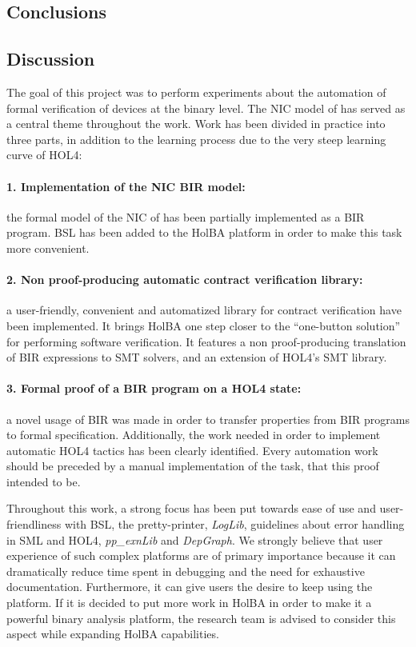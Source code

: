 \documentclass[10pt,a4paper]{article}
\begin{document}
\begin{multicols}{2}
\section{Conclusions}

\subsection{Discussion}

The goal of this project was to perform experiments about the automation of formal verification of devices at the binary level. The NIC model of \cite{haglund_formal_2016} has served as a central theme throughout the work. Work has been divided in practice into three parts, in addition to the learning process due to the very steep learning curve of HOL4:

\paragraph{1. Implementation of the NIC BIR model:} the formal model of the NIC of \cite{haglund_formal_2016} has been partially implemented as a BIR program. BSL has been added to the HolBA platform in order to make this task more convenient.

\paragraph{2. Non proof-producing automatic contract verification library:} a user-friendly, convenient and automatized library for contract verification have been implemented. It brings HolBA one step closer to the ``one-button solution'' for performing software verification. It features a non proof-producing translation of BIR expressions to SMT solvers, and an extension of HOL4's SMT library.

\paragraph{3. Formal proof of a BIR program on a HOL4 state:} a novel usage of BIR was made in order to transfer properties from BIR programs to formal specification. Additionally, the work needed in order to implement automatic HOL4 tactics has been clearly identified. Every automation work should be preceded by a manual implementation of the task, that this proof intended to be.

Throughout this work, a strong focus has been put towards ease of use and user-friendliness with BSL, the pretty-printer, \textit{LogLib}, guidelines about error handling in SML and HOL4, \textit{pp\_exnLib} and \textit{DepGraph}. We strongly believe that user experience of such complex platforms are of primary importance because it can dramatically reduce time spent in debugging and the need for exhaustive documentation. Furthermore, it can give users the desire to keep using the platform. If it is decided to put more work in HolBA in order to make it a powerful binary analysis platform, the research team is advised to consider this aspect while expanding HolBA capabilities.


\end{multicols}
\end{document}
